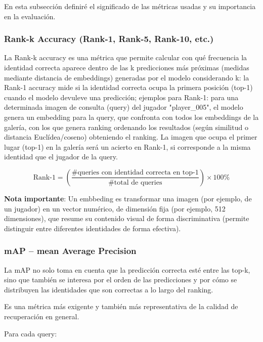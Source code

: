 \documentclass[12pt, a4paper, twoside]{article}
\begin{document}
	En esta subsección definiré el significado de las métricas usadas y su importancia en la evaluación.
	
	\subsubsection{Rank-k Accuracy (Rank-1, Rank-5, Rank-10, etc.)}
	
	La Rank-k accuracy es una métrica que permite calcular con qué frecuencia la identidad correcta aparece dentro de las k predicciones más próximas (medidas mediante distancia de embeddings) generadas por el modelo considerando k: la Rank-1 accuracy mide si la identidad correcta ocupa la primera posición (top-1) cuando el modelo devuleve una predicción; ejemplos para Rank-1: para una determinada imagen de consulta (query) del jugador "player\_005", el modelo genera un embedding para la query, que confronta con todos los embeddings de la galería, con los que genera ranking ordenando los resultados (según similitud o distancia Euclídea/coseno) obteniendo el ranking. La imagen que ocupa el primer lugar (top-1) en la galería será un acierto en Rank-1, si corresponde a la misma identidad que el jugador de la query.
	
	\begin{equation}
		\text{Rank-1} = \left( \frac{\text{\# queries con identidad correcta en top-1}}{\text{\# total de queries}} \right) \times 100\%
	\end{equation}
	
	\textbf{Nota importante}: Un embbeding es transformar una imagen (por ejemplo, de un jugador) en un vector numérico, de dimensión fija (por ejemplo, 512 dimensiones), que resume su contenido visual de forma discriminativa (permite distinguir entre diferentes identidades de forma efectiva).
	
	\subsubsection{mAP – mean Average Precision}
	
	La mAP no solo toma en cuenta que la predicción correcta esté entre las top-k, sino que también se interesa por el orden de las predicciones y por cómo se distribuyen las identidades que son correctas a lo largo del ranking.
	
	Es una métrica más exigente y también más representativa de la calidad de recuperación en general.
	
	
	Para cada query:
	
\end{document}
